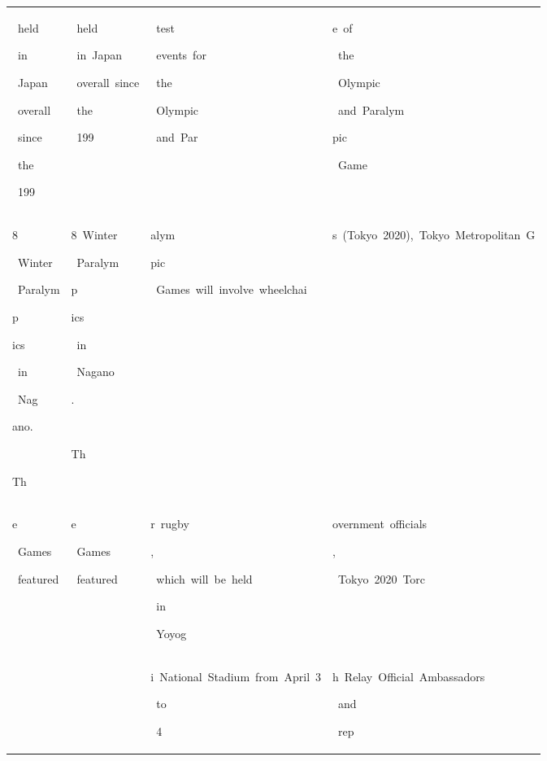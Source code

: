 \begin{table}[h]
\begin{tabular}{ l l l l }
 \colorbox{cm_17!40}{\strut \ held}\colorbox{cm_29!40}{\strut \ in}\colorbox{cm_30!40}{\strut \ Japan}\colorbox{cm_34!40}{\strut \ overall}\colorbox{cm_41!40}{\strut \ since}\colorbox{cm_29!40}{\strut \ the}\colorbox{cm_21!40}{\strut \ 199} & \colorbox{cm_0!40}{\strut \ held}\colorbox{cm_12!40}{\strut \ in\ Japan}\colorbox{cm_0!40}{\strut \ overall\ since}\colorbox{cm_12!40}{\strut \ the}\colorbox{cm_0!40}{\strut \ 199} & \colorbox{cm_0!40}{\strut \ test}\colorbox{cm_12!40}{\strut \ events\ for}\colorbox{cm_25!40}{\strut \ the}\colorbox{cm_0!40}{\strut \ Olympic}\colorbox{cm_12!40}{\strut \ and\ Par} & \colorbox{cm_0!40}{\strut e\ of}\colorbox{cm_12!40}{\strut \ the}\colorbox{cm_0!40}{\strut \ Olympic}\colorbox{cm_12!40}{\strut \ and\ Paralym}\colorbox{cm_25!40}{\strut pic}\colorbox{cm_0!40}{\strut \ Game} \\ 
 \colorbox{cm_21!40}{\strut 8}\colorbox{cm_45!40}{\strut \ Winter}\colorbox{cm_33!40}{\strut \ Paralym}\colorbox{cm_32!40}{\strut p}\colorbox{cm_31!40}{\strut ics}\colorbox{cm_27!40}{\strut \ in}\colorbox{cm_34!40}{\strut \ Nag}\colorbox{cm_31!40}{\strut ano.}\colorbox{cm_43!40}{\strut \ }\colorbox{cm_46!40}{\strut }\colorbox{cm_32!40}{\strut Th} & \colorbox{cm_0!40}{\strut 8\ Winter}\colorbox{cm_12!40}{\strut \ Paralym}\colorbox{cm_25!40}{\strut p}\colorbox{cm_38!40}{\strut ics}\colorbox{cm_12!40}{\strut \ in}\colorbox{cm_0!40}{\strut \ Nagano}\colorbox{cm_12!40}{\strut .}\colorbox{cm_25!40}{\strut \ }\colorbox{cm_12!40}{\strut }\colorbox{cm_25!40}{\strut }\colorbox{cm_38!40}{\strut Th} & \colorbox{cm_12!40}{\strut alym}\colorbox{cm_25!40}{\strut pic}\colorbox{cm_0!40}{\strut \ Games\ will\ involve\ wheelchai} & \colorbox{cm_0!40}{\strut s\ (Tokyo\ 2020),\ Tokyo\ Metropolitan\ G} \\ 
 \colorbox{cm_32!40}{\strut e}\colorbox{cm_9!40}{\strut \ Games}\colorbox{cm_37!40}{\strut \ featured} & \colorbox{cm_38!40}{\strut e}\colorbox{cm_12!40}{\strut \ Games}\colorbox{cm_0!40}{\strut \ featured} & \colorbox{cm_0!40}{\strut r\ rugby}\colorbox{cm_12!40}{\strut ,}\colorbox{cm_0!40}{\strut \ which\ will\ be\ held}\colorbox{cm_12!40}{\strut \ in}\colorbox{cm_0!40}{\strut \ Yoyog} & \colorbox{cm_0!40}{\strut overnment\ officials}\colorbox{cm_12!40}{\strut ,}\colorbox{cm_0!40}{\strut \ Tokyo\ 2020\ Torc} \\ 
  &  & \colorbox{cm_0!40}{\strut i\ National\ Stadium\ from\ April\ 3}\colorbox{cm_12!40}{\strut \ to}\colorbox{cm_0!40}{\strut \ 4} & \colorbox{cm_0!40}{\strut h\ Relay\ Official\ Ambassadors}\colorbox{cm_12!40}{\strut \ and}\colorbox{cm_0!40}{\strut \ rep} \\ 

\end{tabular}
\end{table}
